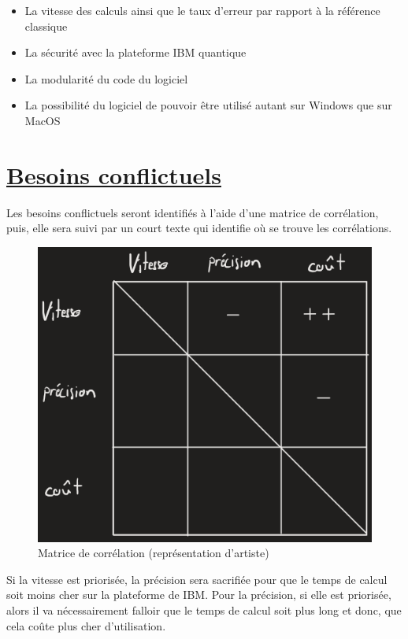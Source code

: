 \documentclass[11pt]{article}
\begin{document}
\begin{itemize}
  \item La vitesse des calculs ainsi que le taux d'erreur par rapport à la référence classique
  \item La sécurité avec la plateforme IBM quantique
  \item La modularité du code du logiciel
  \item La possibilité du logiciel de pouvoir être utilisé autant sur Windows que sur MacOS
\end{itemize}


\section{\underline{Besoins conflictuels}}
Les besoins conflictuels seront identifiés à l'aide d'une matrice de corrélation, puis, elle sera suivi par un court texte qui identifie où se trouve les corrélations.

\begin{figure}[h!]
  \centering
  \includegraphics[scale=0.5]{matriceCorrelation.png}
  \caption{Matrice de corrélation (représentation d'artiste)}
\end{figure}
Si la vitesse est priorisée, la précision sera sacrifiée pour que le temps de calcul soit moins cher sur la plateforme de IBM. Pour la précision, si elle est priorisée, alors il va nécessairement falloir que le temps de calcul soit plus long et donc, que cela coûte plus cher d'utilisation.
\pagebreak
\end{document}
